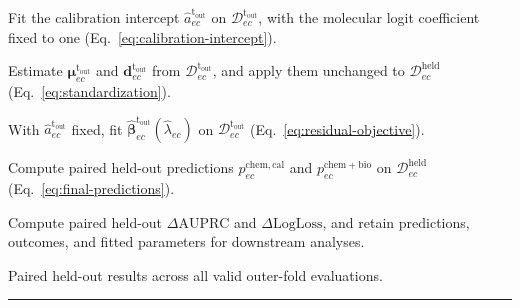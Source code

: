 \documentclass[11pt,a4paper]{article}
\begin{document}
\begin{landscape}
\begin{table}[p]
\begin{algorithmic}[1]
        \State Fit the calibration intercept
        $\widehat a_{ec}^{\mathrm{t_{out}}}$
        on $\mathcal D_{ec}^{\mathrm{t_{out}}}$,
        with the molecular logit coefficient fixed to one
        (Eq.~\ref{eq:calibration-intercept}).

        \State Estimate
        $\boldsymbol\mu_{ec}^{\mathrm{t_{out}}}$ and
        $\mathbf d_{ec}^{\mathrm{t_{out}}}$
        from $\mathcal D_{ec}^{\mathrm{t_{out}}}$,
        and apply them unchanged to
        $\mathcal D_{ec}^{\mathrm{held}}$
        (Eq.~\ref{eq:standardization}).

        \State With
        $\widehat a_{ec}^{\mathrm{t_{out}}}$ fixed, fit
        $\widehat{\boldsymbol\beta}_{ec}^{\mathrm{t_{out}}}
        (\widehat\lambda_{ec})$
        on $\mathcal D_{ec}^{\mathrm{t_{out}}}$
        (Eq.~\ref{eq:residual-objective}).

        \State Compute paired held-out predictions
        $p^{\mathrm{chem,cal}}_{ec}$ and
        $p^{\mathrm{chem+bio}}_{ec}$
        on $\mathcal D_{ec}^{\mathrm{held}}$
        (Eq.~\ref{eq:final-predictions}).

        \State Compute paired held-out
        $\Delta\mathrm{AUPRC}$ and
        $\Delta\mathrm{LogLoss}$, and retain predictions,
        outcomes, and fitted parameters for downstream analyses.

    \EndFor

\EndFor

\State \Return Paired held-out results across all valid outer-fold evaluations.

\end{algorithmic}

\par\nobreak\noindent\rule{\linewidth}{0.8pt}

\end{table}
\endgroup
\end{landscape}
\clearpage
\end{document}
